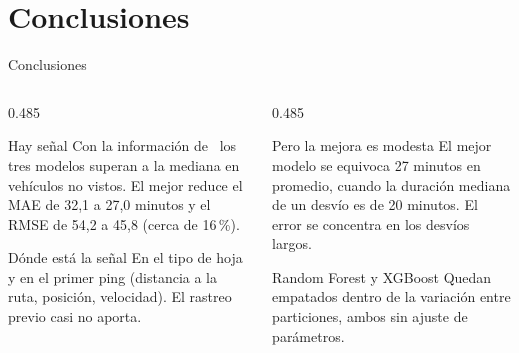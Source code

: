 \documentclass[aspectratio=169,10pt]{beamer}
\begin{document}
\section{Conclusiones}
\begin{frame}{Conclusiones}
  \begin{columns}[T,onlytextwidth]
  \begin{column}{0.485\textwidth}
    \begin{exampleblock}{Hay señal}
      \small Con la información de \T\ los tres modelos superan a la mediana en vehículos no vistos. El mejor reduce el MAE de 32,1 a 27,0 minutos y el RMSE de 54,2 a 45,8 (cerca de 16\,\%).
    \end{exampleblock}
    \vspace{0.2cm}
    \begin{block}{Dónde está la señal}
      \small En el tipo de hoja y en el primer ping (distancia a la ruta, posición, velocidad). El rastreo previo casi no aporta.
    \end{block}
  \end{column}
  \begin{column}{0.485\textwidth}
    \begin{alertblock}{Pero la mejora es modesta}
      \small El mejor modelo se equivoca 27 minutos en promedio, cuando la duración mediana de un desvío es de 20 minutos. El error se concentra en los desvíos largos.
    \end{alertblock}
    \vspace{0.2cm}
    \begin{block}{Random Forest y XGBoost}
      \small Quedan empatados dentro de la variación entre particiones, ambos sin ajuste de parámetros.
    \end{block}
  \end{column}
  \end{columns}
\end{frame}
\end{document}
